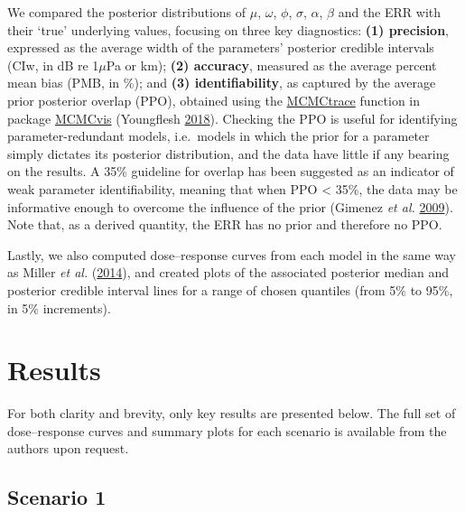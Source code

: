 \documentclass[
]{article}
\begin{document}
We compared the posterior distributions of \(\mu\), \(\omega\), \(\phi\), \(\sigma\), \(\alpha\), \(\beta\) and the ERR with their `true' underlying values, focusing on three key diagnostics: \textbf{(1) precision}, expressed as the average width of the parameters' posterior credible intervals (CIw, in dB re 1\(\mu\)Pa or km); \textbf{(2) accuracy}, measured as the average percent mean bias (PMB, in \%); and \textbf{(3) identifiability}, as captured by the average prior posterior overlap (PPO), obtained using the \href{https://www.rdocumentation.org/packages/MCMCvis/versions/0.7.1/topics/MCMCtrace}{MCMCtrace} function in package \href{https://cran.r-project.org/web/packages/MCMCvis/index.html}{MCMCvis} (Youngflesh \protect\hyperlink{ref-Youngflesh2018}{2018}). Checking the PPO is useful for identifying parameter-redundant models, i.e.~models in which the prior for a parameter simply dictates its posterior distribution, and the data have little if any bearing on the results. A 35\% guideline for overlap has been suggested as an indicator of weak parameter identifiability, meaning that when PPO \textless{} 35\%, the data may be informative enough to overcome the influence of the prior (Gimenez \emph{et al.} \protect\hyperlink{ref-Gimenez2009}{2009}). Note that, as a derived quantity, the ERR has no prior and therefore no PPO.

Lastly, we also computed dose--response curves from each model in the same way as Miller \emph{et al.} (\protect\hyperlink{ref-Miller2014}{2014}), and created plots of the associated posterior median and posterior credible interval lines for a range of chosen quantiles (from 5\% to 95\%, in 5\% increments).

\section{Results}

For both clarity and brevity, only key results are presented below. The full set of dose--response curves and summary plots for each scenario is available from the authors upon request.

\subsection{Scenario 1}
\hypertarget{section51}{}
\end{document}
